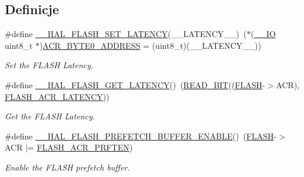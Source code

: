 \subsection*{Definicje}
\begin{DoxyCompactItemize}
\item 
\#define \hyperlink{group___f_l_a_s_h___exported___macros_gac1c9f459b798cc3700b90a6245df5a1a}{\+\_\+\+\_\+\+H\+A\+L\+\_\+\+F\+L\+A\+S\+H\+\_\+\+S\+E\+T\+\_\+\+L\+A\+T\+E\+N\+CY}(\+\_\+\+\_\+\+L\+A\+T\+E\+N\+C\+Y\+\_\+\+\_\+)~($\ast$(\hyperlink{core__sc300_8h_aec43007d9998a0a0e01faede4133d6be}{\+\_\+\+\_\+\+IO} uint8\+\_\+t $\ast$)\hyperlink{group___f_l_a_s_h___private___constants_gaeaca61fbcff69df08100280868bff214}{A\+C\+R\+\_\+\+B\+Y\+T\+E0\+\_\+\+A\+D\+D\+R\+E\+SS} = (uint8\+\_\+t)(\+\_\+\+\_\+\+L\+A\+T\+E\+N\+C\+Y\+\_\+\+\_\+))
\begin{DoxyCompactList}\small\item\em Set the F\+L\+A\+SH Latency. \end{DoxyCompactList}\item 
\#define \hyperlink{group___f_l_a_s_h___exported___macros_gaa537e44d74ce35ff5bfef80edf03f895}{\+\_\+\+\_\+\+H\+A\+L\+\_\+\+F\+L\+A\+S\+H\+\_\+\+G\+E\+T\+\_\+\+L\+A\+T\+E\+N\+CY}()~(\hyperlink{group___exported__macro_ga822bb1bb9710d5f2fa6396b84e583c33}{R\+E\+A\+D\+\_\+\+B\+IT}((\hyperlink{group___peripheral__declaration_ga844ea28ba1e0a5a0e497f16b61ea306b}{F\+L\+A\+SH}-\/$>$A\+CR), \hyperlink{group___peripheral___registers___bits___definition_gaef5e44cbb084160a6004ca9951ec7318}{F\+L\+A\+S\+H\+\_\+\+A\+C\+R\+\_\+\+L\+A\+T\+E\+N\+CY}))
\begin{DoxyCompactList}\small\item\em Get the F\+L\+A\+SH Latency. \end{DoxyCompactList}\item 
\#define \hyperlink{group___f_l_a_s_h___exported___macros_gad36059641057f824516303ea92734e6f}{\+\_\+\+\_\+\+H\+A\+L\+\_\+\+F\+L\+A\+S\+H\+\_\+\+P\+R\+E\+F\+E\+T\+C\+H\+\_\+\+B\+U\+F\+F\+E\+R\+\_\+\+E\+N\+A\+B\+LE}()~(\hyperlink{group___peripheral__declaration_ga844ea28ba1e0a5a0e497f16b61ea306b}{F\+L\+A\+SH}-\/$>$A\+CR $\vert$= \hyperlink{group___peripheral___registers___bits___definition_ga082e7e91fffee86db39676396d01a8e0}{F\+L\+A\+S\+H\+\_\+\+A\+C\+R\+\_\+\+P\+R\+F\+T\+EN})
\begin{DoxyCompactList}\small\item\em Enable the F\+L\+A\+SH prefetch buffer. \end{DoxyCompactList}\item 

\end{DoxyCompactItemize}
